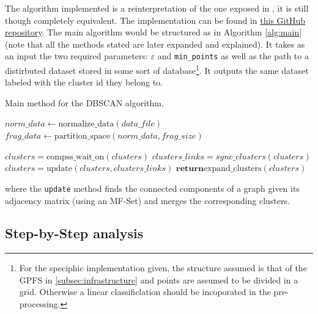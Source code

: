 \documentclass[10pt,journal,compsoc]{IEEEtran}
\let\MYoriglatexcaption\caption
\renewcommand{\caption}[2][\relax]{\MYoriglatexcaption[#2]{#2}}
\begin{document}
The algorithm implemented is a reinterpretation of the one exposed in \cite{ReferencePaper}, it is still though completely equivalent. The implementation can be found in \href{https://github.com/csegarragonz/DBSCAN-pyCOMPSs}{this GitHub repository}. The main algorithm would be structured as in Algorithm \ref{alg:main} (note that all the methods stated are later expanded and explained). It takes as an input the two required parameters: $\varepsilon$ and \texttt{min\_points} as well as the path to a distirbuted dataset stored in some sort of database\footnote{For the speciphic implementation given, the structure assumed is that of the GPFS in \ref{subsec:infrastructure} and points are assumed to be divided in a grid. Otherwise a linear classificlation should be incoporated in the pre-processing.}. It outputs the same dataset labeled with the cluster id they belong to.

\begin{algorithm}
  \caption{Main method for the DBSCAN algorithm. \label{alg:main}}
  \begin{algorithmic}[1]
    	\State $norm\_data \gets \text{normalize\_data}(data\_file)$
		\State $frag\_data \gets \text{partition\_space}(norm\_data, frag\_size)$
            \State {} 
     	\EndFor
        \State $clusters = \text{compss\_wait\_on}(clusters)$
        \State $clusters\_links = sync\_clusters(clusters)$
        \State $clusters = \text{update}(clusters, clusters\_links)$
        \State $\textbf{return} \text{expand\_clusters}(clusters)$
    \EndFunction
  \end{algorithmic}
\end{algorithm}
where the \texttt{update} method finds the connected components of a graph given its adjacency matrix (using an MF-Set) and merges the corresponding clusters.

\subsection{Step-by-Step analysis} \label{step_by_step}
\end{document}
